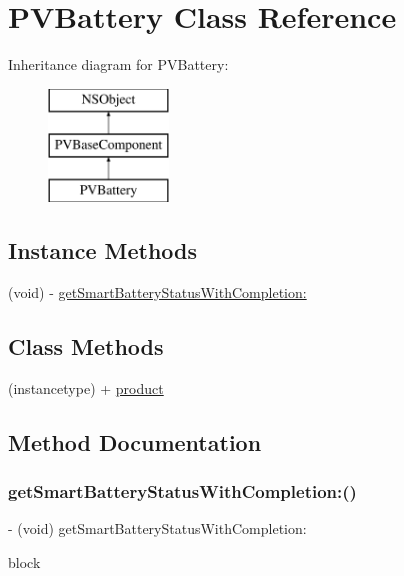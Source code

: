 \hypertarget{interface_p_v_battery}{}\section{P\+V\+Battery Class Reference}
\label{interface_p_v_battery}
Inheritance diagram for P\+V\+Battery\+:\begin{figure}[H]
\begin{center}
\leavevmode
\includegraphics[height=3.000000cm]{interface_p_v_battery}
\end{center}
\end{figure}
\subsection*{Instance Methods}
\begin{DoxyCompactItemize}
\item 
(void) -\/ \hyperlink{interface_p_v_battery_ad4146aa159f9bf4beca2f1b5ee6b3d8d}{get\+Smart\+Battery\+Status\+With\+Completion\+:}
\end{DoxyCompactItemize}
\subsection*{Class Methods}
\begin{DoxyCompactItemize}
\item 
(instancetype) + \hyperlink{interface_p_v_battery_ab535021632652493bcf2decadff6bc78}{product}
\end{DoxyCompactItemize}


\subsection{Method Documentation}
\mbox{\label{interface_p_v_battery_ad4146aa159f9bf4beca2f1b5ee6b3d8d}} 
\subsubsection{\texorpdfstring{get\+Smart\+Battery\+Status\+With\+Completion\+:()}{getSmartBatteryStatusWithCompletion:()}}
{\footnotesize\ttfamily -\/ (void) get\+Smart\+Battery\+Status\+With\+Completion\+: \begin{DoxyParamCaption}\item[{(void($^\wedge$)(\hyperlink{struct_p_v_battery_status}{P\+V\+Battery\+Status} battery\+Status, N\+S\+Error $\ast$error))}]{block }\end{DoxyParamCaption}}

